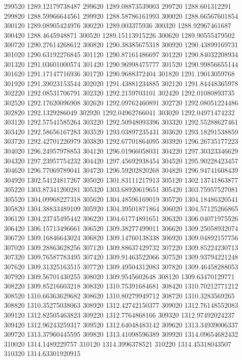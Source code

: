 {299520 1289.12179738487
299620 1289.08873539003
299720 1288.601312291
299820 1288.59966644561
299920 1288.58786161993
300020 1288.66567601854
300120 1289.08905424976
300220 1289.003375936
300320 1288.92967461687
300420 1288.4645948871
300520 1289.15113915226
300620 1289.90555479502
300720 1290.27614268612
300820 1290.38385675318
300920 1290.43899169731
301020 1290.63192276845
301120 1290.87161486697
301220 1290.84032208934
301320 1291.03601000574
301420 1290.96998475777
301520 1290.99856655144
301620 1291.17147716936
301720 1290.9688372404
301820 1291.19013059768
301920 1291.39023153544
302020 1291.43881234885
302120 1291.84448365978
302220 1292.08531706791
302320 1292.2159703101
302420 1292.01080893735
302520 1292.17620096908
302620 1292.09762460891
302720 1292.08051224486
302820 1292.1329286049
302920 1292.04962766041
303020 1292.04971474232
303120 1292.57541585264
303220 1292.50948093396
303320 1292.55288627461
303420 1292.58656167283
303520 1293.03897235431
303620 1293.18291538859
303720 1292.42701226979
303820 1292.67701864095
303920 1296.26735177223
304020 1296.24957978853
304120 1296.01966058031
304220 1297.30323346629
304320 1297.23957754232
304420 1297.45692938454
304520 1295.90228423457
304620 1296.77069789041
304720 1296.59202820268
304820 1296.94741608439
304920 1302.54124817267
305020 1301.83111217913
305120 1302.13741863877
305220 1303.87341200281
305320 1303.68920619651
305420 1303.75957527081
305520 1304.09968227318
305620 1304.48596169019
305720 1304.18486320541
305820 1304.38833489109
305920 1304.39501871864
306020 1304.57125266865
306120 1304.23745495442
306220 1304.61774891651
306320 1306.04071975526
306420 1306.15713496661
306520 1309.38277499011
306620 1309.25058932074
306720 1309.16846643024
306820 1309.14760138338
306920 1309.04892157756
307020 1309.28863628256
307120 1309.88637429732
307220 1309.85224230713
307320 1309.76587783495
307420 1309.91463522066
307520 1309.93794221248
307620 1309.31325163515
307720 1309.49504312083
307820 1309.46458288053
307920 1309.56701430255
308020 1309.9545602648
308120 1309.63470129771
308220 1309.85216603218
308320 1310.75391684681
308420 1310.70212771212
308520 1310.66363629682
308620 1310.80279949712
308720 1310.3283569265
308820 1310.35275038063
308920 1312.42742150377
309020 1312.76148552083
309120 1312.82505463823
309220 1312.7764868166
309320 1312.97492024237
309420 1312.96243259317
309520 1312.64048483142
309620 1313.34939006337
309720 1313.37960445595
309820 1313.41098596389
309920 1314.09654682432
310020 1314.1489229757
310120 1314.3996378521
310220 1314.45318043507
310320 1314.63301920915
}
